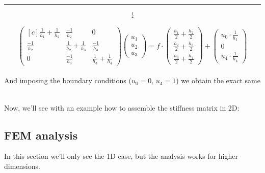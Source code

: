 \begin{example}
\begin{center}
    \vspace{-0.8cm}
    \rule{12.75cm}{0.4pt}
\end{center}
\vspace{-0.1cm}
$$\text{\rotatebox{270}{$\leadsto$}}$$

\[
\begin{pmatrix*}[c]
    \frac{1}{h_1} + \frac{1}{h_2} & \frac{-1}{h_2}                 & 0                             \\[0.2cm]
    \frac{-1}{h_2}                & \frac{1}{h_2} + \frac{1}{h_3}  & \frac{-1}{h_3}                \\[0.2cm]
    0                             & \frac{-1}{h_3}                 & \frac{1}{h_3} + \frac{1}{h_4}
  \end{pmatrix*}
\begin{pmatrix}
  u_1 \\[0.2cm] u_2 \\[0.2cm] u_3
\end{pmatrix} = 
f\cdot
\begin{pmatrix}
  \frac{h_1}{2} + \frac{h_2}{2} \\[0.2cm] \frac{h_2}{2} + \frac{h_3}{2} \\[0.2cm] 
  \frac{h_3}{2} + \frac{h_4}{2}
\end{pmatrix} +
\begin{pmatrix}
  u_0\cdot\frac{1}{h_1} \\[0.2cm] 0 \\[0.2cm] u_4\cdot\frac{1}{h_4}
\end{pmatrix}
\]\-\\
And imposing the boundary conditions ($u_0 = 0, \, u_4 = 1$) we obtain the exact same 

\end{example}
\-\\
Now, we'll see with an example how to assemble the stiffness matrix in 2D:

\begin{example}
  
\end{example}

\newpage

\subsection{FEM analysis}

\begin{remark}
  In this section we'll only see the 1D case, but the analysis works for higher dimensions.
\end{remark}

